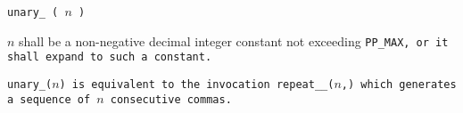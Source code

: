 
\tt{unary_ (} $n$ \tt{)}


$n$ shall be a non-negative decimal integer constant not exceeding \tt{PP_MAX},
or it shall expand to such a constant.


\tt{unary_(}$n$\tt{)} is equivalent to the invocation \tt{repeat__(}$n$\tt{,)}
which generates a sequence of $n$ consecutive commas.
